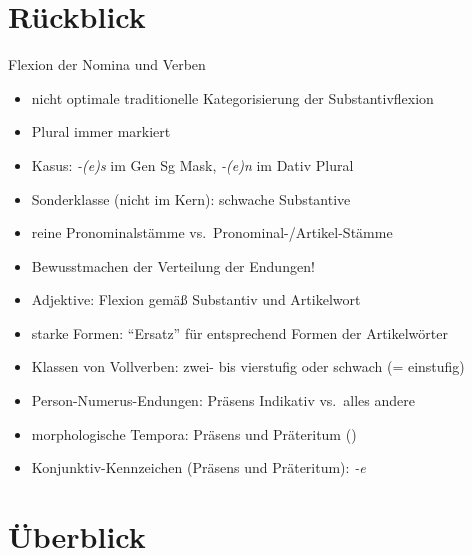 
\section{Rückblick}

\begin{frame}
  {Flexion der Nomina und Verben}
  \begin{itemize}[<+->]
    \item nicht optimale traditionelle Kategorisierung der Substantivflexion
    \item Plural immer markiert
    \item Kasus: \textit{-(e)s} im Gen Sg Mask, \textit{-(e)n} im Dativ Plural
    \item Sonderklasse (nicht im Kern): schwache Substantive
      \Halbzeile
    \item reine Pronominalstämme vs.\ Pronominal-\slash Artikel-Stämme
    \item \alert{Bewusstmachen der Verteilung der Endungen!}
      \Halbzeile
    \item Adjektive: Flexion gemäß Substantiv \alert{und} Artikelwort
    \item starke Formen: "`Ersatz"' für entsprechend Formen der Artikelwörter
      \Halbzeile
    \item Klassen von Vollverben: zwei- bis vierstufig oder schwach (= einstufig)
    \item Person-Numerus-Endungen: Präsens Indikativ vs.\ alles andere
    \item morphologische Tempora: Präsens und Präteritum ()
    \item Konjunktiv-Kennzeichen (Präsens und Präteritum): \textit{-e}
  \end{itemize}
\end{frame}


\section{Überblick}

